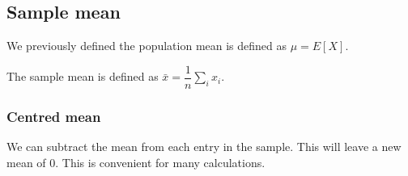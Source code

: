 
\subsection{Sample mean}

We previously defined the population mean is defined as \(\mu=E[X]\).

The sample mean is defined as \(\bar x = \dfrac{1}{n}\sum_i x_i\).

\subsubsection{Centred mean}

We can subtract the mean from each entry in the sample. This will leave a new mean of \(0\). This is convenient for many calculations.

